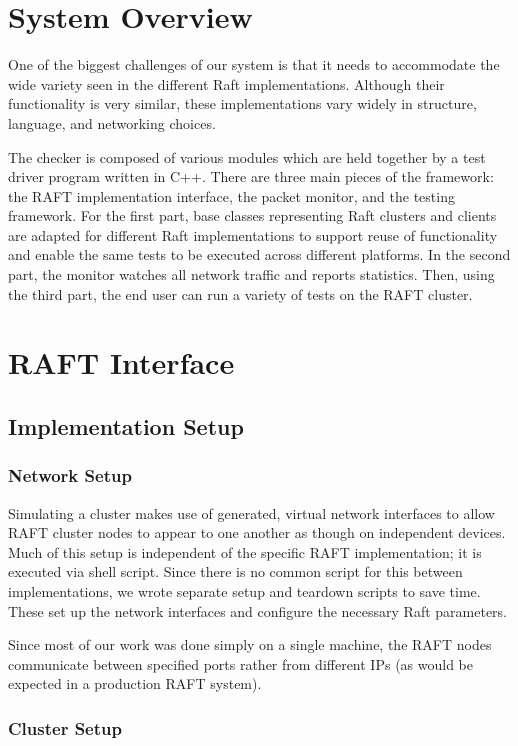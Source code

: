\documentclass[UTF8]{article}
\begin{document}
\section{System Overview}
One of the biggest challenges of our system is that it needs to accommodate the wide variety seen in the different Raft implementations. Although their functionality is very similar, these implementations vary widely in structure, language, and networking choices.

The checker is composed of various modules which are held together by a test driver program written in C++. There are three main pieces of the framework: the RAFT implementation interface, the packet monitor, and the testing framework. For the first part, base classes representing Raft clusters and clients are adapted for different Raft implementations to support reuse of functionality and enable the same tests to be executed across different platforms. In the second part, the monitor watches all network traffic and reports statistics. Then, using the third part, the end user can run a variety of tests on the RAFT cluster.

\section{RAFT Interface}

\subsection{Implementation Setup}

\subsubsection{Network Setup}

Simulating a cluster makes use of generated, virtual network interfaces to allow RAFT cluster nodes to appear to one another as though on independent devices. Much of this setup is independent of the specific RAFT implementation; it is executed via shell script. Since there is no common script for this between implementations, we wrote separate setup and teardown scripts to save time. These set up the network interfaces and configure the necessary Raft parameters.

Since most of our work was done simply on a single machine, the RAFT nodes communicate between specified ports rather from different IPs (as would be expected in a production RAFT system).

\subsubsection{Cluster Setup}
\end{document}

